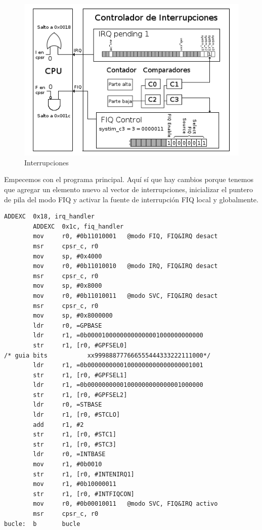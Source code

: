 \begin{figure}[h]
  \centering
    \includegraphics[width=14cm]{graphs/inter5.png}
  \caption{Interrupciones}
  \label{fig:inter5}
\end{figure}

Empecemos con el programa principal. Aquí sí que hay cambios porque tenemos que agregar un
elemento nuevo al vector de interrupciones, inicializar el puntero de pila del modo FIQ y activar
la fuente de interrupción FIQ local y globalmente.

\begin{lstlisting}[caption={Programa principal de inter5.s},label={lst:codigoPract5_5}]
        ADDEXC  0x18, irq_handler
        ADDEXC  0x1c, fiq_handler
        mov     r0, #0b11010001   @modo FIQ, FIQ&IRQ desact
        msr     cpsr_c, r0
        mov     sp, #0x4000
        mov     r0, #0b11010010   @modo IRQ, FIQ&IRQ desact
        msr     cpsr_c, r0
        mov     sp, #0x8000
        mov     r0, #0b11010011   @modo SVC, FIQ&IRQ desact
        msr     cpsr_c, r0
        mov     sp, #0x8000000
        ldr     r0, =GPBASE
        ldr     r1, =0b00001000000000000001000000000000
        str     r1, [r0, #GPFSEL0]
/* guia bits           xx999888777666555444333222111000*/
        ldr     r1, =0b00000000001000000000000000001001
        str     r1, [r0, #GPFSEL1]
        ldr     r1, =0b00000000001000000000000001000000
        str     r1, [r0, #GPFSEL2]
        ldr     r0, =STBASE
        ldr     r1, [r0, #STCLO]
        add     r1, #2
        str     r1, [r0, #STC1]
        str     r1, [r0, #STC3]
        ldr     r0, =INTBASE
        mov     r1, #0b0010
        str     r1, [r0, #INTENIRQ1]
        mov     r1, #0b10000011
        str     r1, [r0, #INTFIQCON]
        mov     r0, #0b00010011   @modo SVC, FIQ&IRQ activo
        msr     cpsr_c, r0
bucle:  b       bucle
\end{lstlisting}

